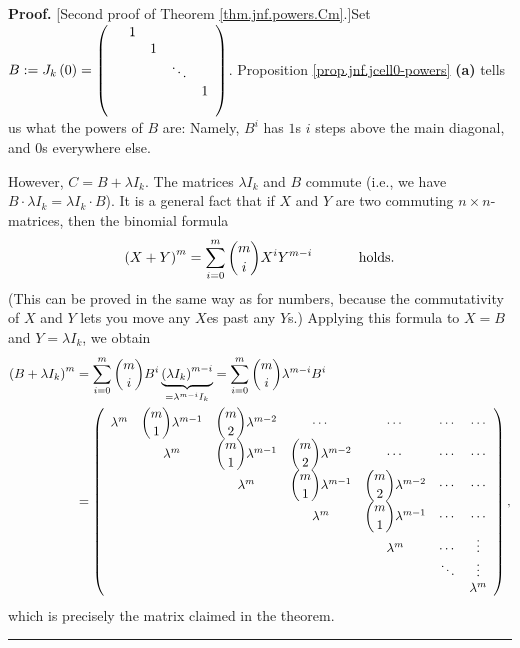 \documentclass[numbers=enddot,12pt,final,onecolumn,notitlepage]{scrartcl}%
\numberwithin{exer}{subsection}
\theoremstyle{definition}
\newenvironment{proof}[1][Proof]{\noindent\textbf{#1.} }{\ \rule{0.5em}{0.5em}}
\let\sumnonlimits\sum
\renewcommand{\sum}{\sumnonlimits\limits}
\begin{document}
\begin{proof}
[Second proof of Theorem \ref{thm.jnf.powers.Cm}.]Set $B:=J_{k}\left(
0\right)  =\left(
\begin{array}
[c]{ccccc}
& 1 &  &  & \\
&  & 1 &  & \\
&  &  & \ddots & \\
&  &  &  & 1\\
&  &  &  &
\end{array}
\right)  $. Proposition \ref{prop.jnf.jcell0-powers} \textbf{(a)} tells us
what the powers of $B$ are: Namely, $B^{i}$ has $1$s $i$ steps above the main
diagonal, and $0$s everywhere else.

However, $C=B+\lambda I_{k}$. The matrices $\lambda I_{k}$ and $B$ commute
(i.e., we have $B\cdot\lambda I_{k}=\lambda I_{k}\cdot B$). It is a general
fact that if $X$ and $Y$ are two commuting $n\times n$-matrices, then the
binomial formula%
\[
\left(  X+Y\right)  ^{m}=\sum_{i=0}^{m}\dbinom{m}{i}X^{i}Y^{m-i}%
\ \ \ \ \ \ \ \ \ \ \text{holds.}%
\]
(This can be proved in the same way as for numbers, because the commutativity
of $X$ and $Y$ lets you move any $X$es past any $Y$s.) Applying this formula
to $X=B$ and $Y=\lambda I_{k}$, we obtain%
\begin{align*}
\left(  B+\lambda I_{k}\right)  ^{m}  &  =\sum_{i=0}^{m}\dbinom{m}{i}%
B^{i}\underbrace{\left(  \lambda I_{k}\right)  ^{m-i}}_{=\lambda^{m-i}I_{k}%
}=\sum_{i=0}^{m}\dbinom{m}{i}\lambda^{m-i}B^{i}\\
&  =\left(
\begin{array}
[c]{ccccccc}%
\lambda^{m} & \dbinom{m}{1}\lambda^{m-1} & \dbinom{m}{2}\lambda^{m-2} & \cdots
& \cdots & \cdots & \cdots\\
& \lambda^{m} & \dbinom{m}{1}\lambda^{m-1} & \dbinom{m}{2}\lambda^{m-2} &
\cdots & \cdots & \cdots\\
&  & \lambda^{m} & \dbinom{m}{1}\lambda^{m-1} & \dbinom{m}{2}\lambda^{m-2} &
\cdots & \cdots\\
&  &  & \lambda^{m} & \dbinom{m}{1}\lambda^{m-1} & \cdots & \cdots\\
&  &  &  & \lambda^{m} & \cdots & \vdots\\
&  &  &  &  & \ddots & \vdots\\
&  &  &  &  &  & \lambda^{m}%
\end{array}
\right)  ,
\end{align*}
which is precisely the matrix claimed in the theorem.
\end{proof}
\end{document}
